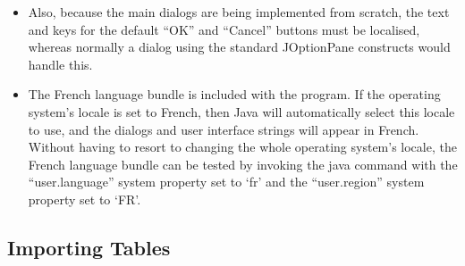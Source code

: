\begin{itemize}
\item Also, because the main dialogs are being implemented from scratch, the
text and keys for the default ``OK'' and ``Cancel'' buttons must be localised,
whereas normally a dialog using the standard JOptionPane constructs would
handle this.

\item The French language bundle is included with the program. If the operating
system's locale is set to French, then Java will automatically select this
locale to use, and the dialogs and user interface strings will appear in
French. Without having to resort to changing the whole operating system's
locale, the French language bundle can be tested by invoking the java command
with the ``user.language'' system property set to `fr' and the ``user.region''
system property set to `FR'.

\end{itemize}

\subsection{Importing Tables}

